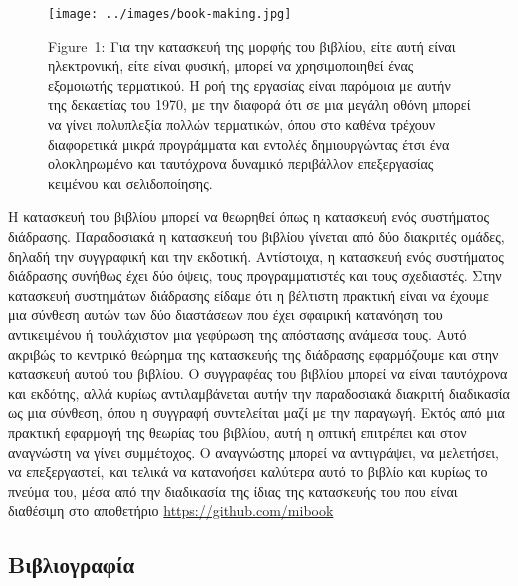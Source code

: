 \documentclass[
]{article}
\newlength{\cslhangindent}
\newlength{\cslentryspacingunit} %
\newenvironment{CSLReferences}[2] %
 {%
  \setlength{\parindent}{0pt}
  \ifodd #1
  \let\oldpar\par
  \def\par{\hangindent=\cslhangindent\oldpar}
  \fi
  \setlength{\parskip}{#2\cslentryspacingunit}
 }%
 {}
\begin{document}
\leavevmode{}%
\begin{figure}
\hypertarget{fig:book-making}{%
\centering
\texttt{[image: ../images/book-making.jpg]}
\caption{Figure~1: Για την κατασκευή της μορφής του βιβλίου, είτε αυτή
είναι ηλεκτρονική, είτε είναι φυσική, μπορεί να χρησιμοποιηθεί ένας
εξομοιωτής τερματικού. Η ροή της εργασίας είναι παρόμοια με αυτήν της
δεκαετίας του 1970, με την διαφορά ότι σε μια μεγάλη οθόνη μπορεί να
γίνει πολυπλεξία πολλών τερματικών, όπου στο καθένα τρέχουν διαφορετικά
μικρά προγράμματα και εντολές δημιουργώντας έτσι ένα ολοκληρωμένο και
ταυτόχρονα δυναμικό περιβάλλον επεξεργασίας κειμένου και
σελιδοποίησης.}\label{fig:book-making}
}
\end{figure}

Η κατασκευή του βιβλίου μπορεί να θεωρηθεί όπως η κατασκευή ενός
συστήματος διάδρασης. Παραδοσιακά η κατασκευή του βιβλίου γίνεται από
δύο διακριτές ομάδες, δηλαδή την συγγραφική και την εκδοτική.
Αντίστοιχα, η κατασκευή ενός συστήματος διάδρασης συνήθως έχει δύο
όψεις, τους προγραμματιστές και τους σχεδιαστές. Στην κατασκευή
συστημάτων διάδρασης είδαμε ότι η βέλτιστη πρακτική είναι να έχουμε μια
σύνθεση αυτών των δύο διαστάσεων που έχει σφαιρική κατανόηση του
αντικειμένου ή τουλάχιστον μια γεφύρωση της απόστασης ανάμεσα τους. Αυτό
ακριβώς το κεντρικό θεώρημα της κατασκευής της διάδρασης εφαρμόζουμε και
στην κατασκευή αυτού του βιβλίου. Ο συγγραφέας του βιβλίου μπορεί να
είναι ταυτόχρονα και εκδότης, αλλά κυρίως αντιλαμβάνεται αυτήν την
παραδοσιακά διακριτή διαδικασία ως μια σύνθεση, όπου η συγγραφή
συντελείται μαζί με την παραγωγή. Εκτός από μια πρακτική εφαρμογή της
θεωρίας του βιβλίου, αυτή η οπτική επιτρέπει και στον αναγνώστη να γίνει
συμμέτοχος. Ο αναγνώστης μπορεί να αντιγράψει, να μελετήσει, να
επεξεργαστεί, και τελικά να κατανοήσει καλύτερα αυτό το βιβλίο και
κυρίως το πνεύμα του, μέσα από την διαδικασία της ίδιας της κατασκευής
του που είναι διαθέσιμη στο αποθετήριο \url{https://github.com/mibook}

\hypertarget{ux3b2ux3b9ux3b2ux3bbux3b9ux3bfux3b3ux3c1ux3b1ux3c6ux3afux3b1}{%
\subsection*{Βιβλιογραφία}\label{ux3b2ux3b9ux3b2ux3bbux3b9ux3bfux3b3ux3c1ux3b1ux3c6ux3afux3b1}}

\hypertarget{refs}{}
\begin{CSLReferences}{0}{0}
\end{CSLReferences}
\end{document}
